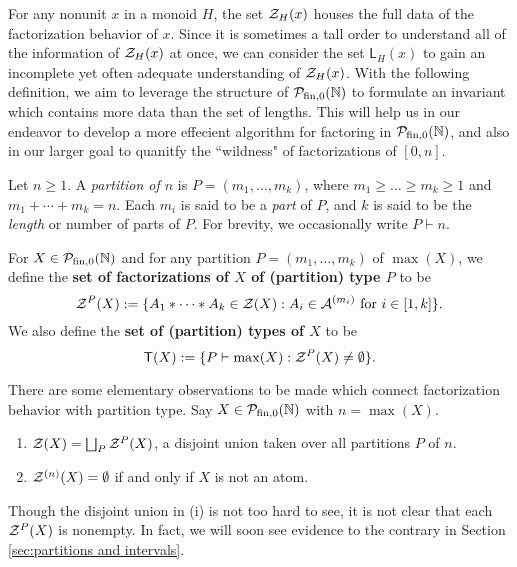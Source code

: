 For any nonunit $x$ in a monoid $H$, the set $\mathcal{Z}_H(x)$ houses the full data of the factorization behavior of $x$. 
Since it is sometimes a tall order to understand all of the information of $\mathcal{Z}_H(x)$ at once, we can consider the set $\mathsf{L}_H(x)$ to gain an incomplete yet often adequate understanding of $\mathcal{Z}_H(x)$.
With the following definition, we aim to leverage the structure of ${\mathcal{P}_{\textrm{fin},0}(\mathbb{N})}$ to formulate an invariant which contains more data than the set of lengths.
This will help us in our endeavor to develop a more effecient algorithm for factoring in ${\mathcal{P}_{\textrm{fin},0}(\mathbb{N})}$, and also in our larger goal to quanitfy the ``wildness" of factorizations of $[ 0,n]$.


\begin{defn} \label{def:partition type}
	Let $n\ge 1$. A \textit{partition of $n$} is $P = (m_1,\dots, m_k)$, where $m_1 \ge \dots \ge m_k \ge 1$ and $m_1+\cdots + m_k = n$. 
	Each $m_i$ is said to be a \textit{part} of $P$, and $k$ is said to be the \textit{length} or number of parts of $P$.
	For brevity, we occasionally write $P \vdash n$.
	
	For $X \in {\mathcal{P}_{\textrm{fin},0}(\mathbb{N})}$ and for any partition $P = (m_1,\dots, m_k)$ of $\max(X)$, we define the \textbf{set of factorizations of $X$ of (partition) type $P$} to be
	\[ \mathcal{Z}^P(X) := \{ A_1*\cdots * A_k \in \mathcal{Z}(X) : A_i \in \mathcal{A}^{(m_i)} \textrm{ for } i\in [ 1,k ] \}. \]
	We also define the \textbf{set of (partition) types of $X$} to be
	\[ \mathsf{T}(X) :=  \{ P \vdash \max(X) : \mathcal{Z}^P(X) \neq \emptyset \}. \]
\end{defn}

\begin{rk}
	There are some elementary observations to be made which connect factorization behavior with partition type.
	Say $X \in {\mathcal{P}_{\textrm{fin},0}(\mathbb{N})}$ with $n = \max(X)$.
	\begin{enumerate}[label={\rm (\roman{*})}]
		\item $\mathcal{Z}(X) = \bigsqcup_{P} \mathcal{Z}^P(X)$, a disjoint union taken over all partitions $P$ of $n$.
		\item $\mathcal{Z}^{(n)}(X) = \emptyset$ if and only if $X$ is not an atom.
	\end{enumerate}
	Though the disjoint union in (i) is not too hard to see, it is not clear that each $\mathcal{Z}^P(X)$ is nonempty.
	In fact, we will soon see evidence to the contrary in Section \ref{sec:partitions and intervals}.
\end{rk}


